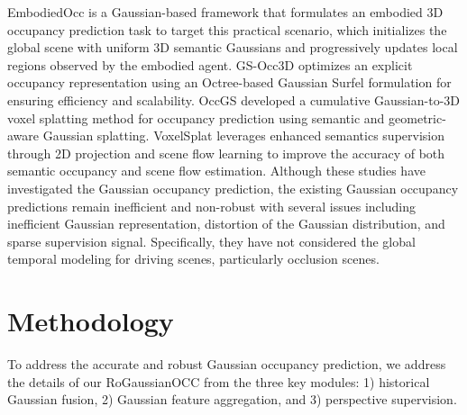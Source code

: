 \documentclass[journal]{IEEEtran}
\begin{document}
EmbodiedOcc \cite{wu2025embodiedocc,wang2025embodiedocc++} is a Gaussian-based framework that formulates an embodied 3D occupancy prediction task to target this practical scenario, which initializes the global scene with uniform 3D semantic Gaussians and progressively updates local regions observed by the embodied agent.
GS-Occ3D \cite{ye2025gs} optimizes an explicit occupancy representation using an Octree-based Gaussian Surfel formulation for ensuring efficiency and scalability.
OccGS \cite{zhou2025occgs} developed a cumulative Gaussian-to-3D voxel splatting method for occupancy prediction using semantic and geometric-aware Gaussian splatting.
VoxelSplat \cite{zhu2025voxelsplat} leverages enhanced semantics supervision through 2D projection and scene flow learning to improve the accuracy of both semantic occupancy and scene flow estimation.
Although these studies have investigated the Gaussian occupancy prediction, the existing Gaussian occupancy predictions remain inefficient and non-robust with several issues including inefficient Gaussian representation, distortion of the Gaussian distribution, and sparse supervision signal.
Specifically, they have not considered the global temporal modeling for driving scenes, particularly occlusion scenes.




\section{Methodology}
\label{sec:methodology}

To address the accurate and robust Gaussian occupancy prediction, we address the details of our RoGaussianOCC from the three key modules: 1) historical Gaussian fusion, 2) Gaussian feature aggregation, and 3) perspective supervision. 
\end{document}
